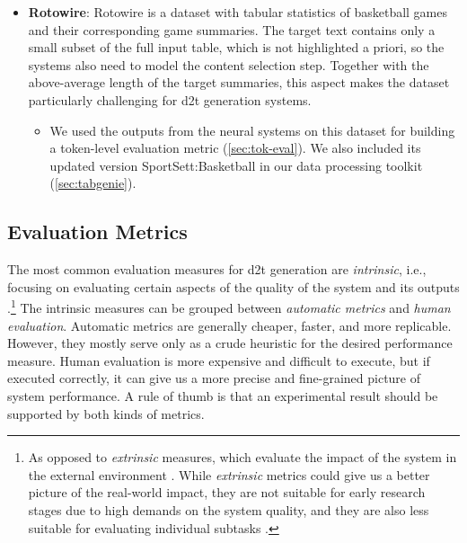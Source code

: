 {\begin{itemize}
    \item \textbf{Rotowire}: Rotowire \cite{wiseman2017challenges} is a dataset with tabular statistics of basketball games and their corresponding game summaries. The target text contains only a small subset of the full input table, which is not highlighted a priori, so the systems also need to model the content selection step. Together with the above-average length of the target summaries, this aspect makes the dataset particularly challenging for \ac{d2t} generation systems.
          \begin{itemize}
              \item
                    We used the outputs from the neural systems on this dataset for building a token-level evaluation metric (\autoref{sec:tok-eval}). We also included its updated version SportSett:Basketball \cite{thomson2020sportsett} in our data processing toolkit (\autoref{sec:tabgenie}).
          \end{itemize}
\end{itemize}



\subsection{Evaluation Metrics}
\label{sec:evaluation}

The most common evaluation measures for \ac{d2t} generation are \emph{intrinsic}, i.e., focusing on evaluating certain aspects of the quality of the system and its outputs \cite{gkatzia2015snapshot,celikyilmazEvaluationTextGeneration2021}.\footnote{As opposed to \emph{extrinsic} measures, which evaluate the impact of the system in the external environment \cite{celikyilmazEvaluationTextGeneration2021}. While \emph{extrinsic} metrics could give us a better picture of the real-world impact, they are not suitable for early research stages due to high demands on the system quality, and they are also less suitable for evaluating individual subtasks \cite{van2019best}.} The intrinsic measures can be grouped between \emph{automatic metrics} and \emph{human evaluation}. Automatic metrics are generally cheaper, faster, and more replicable. However, they mostly serve only as a crude heuristic for the desired performance measure. Human evaluation is more expensive and difficult to execute, but if executed correctly, it can give us a more precise and fine-grained picture of system performance. A rule of thumb is that an experimental result should be supported by both kinds of metrics.


}
